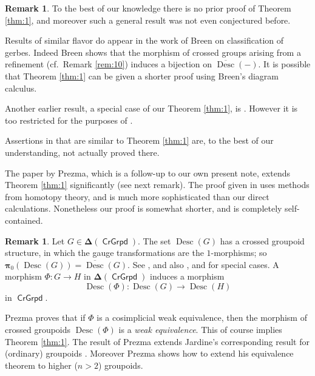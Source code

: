 \documentclass[a4paper,10pt]{amsart}
\theoremstyle{definition}
\newtheorem{rem}[equation]{Remark}
\numberwithin{equation}{section}
\newcommand{\opn}{\operatorname}
\newcommand{\cat}[1]{\operatorname{\mathsf{#1}}}
\newcommand{\ol}{\overline}
\newcommand{\bsym}[1]{\boldsymbol{#1}}
\begin{document}
\begin{rem}
To the best of our knowledge there is no prior proof of Theorem \ref{thm:1},
and moreover such a general result was not even conjectured before.

Results of similar flavor do appear in the work of Breen \cite{Br1, Br2} on 
classification of gerbes. Indeed Breen shows that the morphism of crossed
groups arising from a refinement (cf.\ Remark \ref{rem:10}) 
induces a bijection on $\ol{\opn{Desc}}(-)$. 
It is possible that Theorem \ref{thm:1} can be given a shorter proof using
Breen's diagram calculus. 

Another earlier result, a special case of our Theorem \ref{thm:1}, is
\cite[Proposition 3.3.1]{BGNT1}. However it is too restricted for the purposes
of \cite{Ye1}. 

Assertions in \cite{CH} that are similar to Theorem
\ref{thm:1} are, to the best of our understanding, not actually proved there. 

The paper \cite{Pr} by Prezma, which is a follow-up to our own present note, 
extends Theorem \ref{thm:1} significantly (see next remark). The proof given
in \cite{Pr} uses methods from homotopy
theory, and is much more sophisticated than our direct calculations. 
Nonetheless our proof is somewhat shorter, and is completely self-contained. 
\end{rem}

\begin{rem} \label{rem:cosim.1}
Let $G \in \bsym{\Delta} (\cat{CrGrpd})$.
The set $\opn{Desc}(G)$ has a crossed groupoid structure, in
which the gauge transformations are the $1$-morphisms; so 
$\bsym{\pi}_0(  \opn{Desc}(G) ) = \ol{\opn{Desc}}(G)$.
See \cite{Pr}, and also \cite[Section 5]{Br2}, \cite{Hi} and \cite{BGNT1} for
special cases. A morphism $\Phi : G \to H$ in 
$\bsym{\Delta} (\cat{CrGrpd})$ induces a morphism 
\[ \opn{Desc}(\Phi) : \opn{Desc}(G) \to 
\opn{Desc}(H) \]
in $\cat{CrGrpd}$. 

Prezma \cite{Pr} proves that if $\Phi$ is a cosimplicial weak equivalence,  then 
the morphism of crossed groupoids $\opn{Desc}(\Phi)$ is a {\em weak
equivalence}. This of course implies Theorem \ref{thm:1}.
The result of Prezma extends Jardine's
corresponding result for (ordinary) groupoids \cite{Ja}.
Moreover Prezma shows how to extend his equivalence theorem to higher 
($n > 2$) groupoids.
\end{rem}
\end{document}
